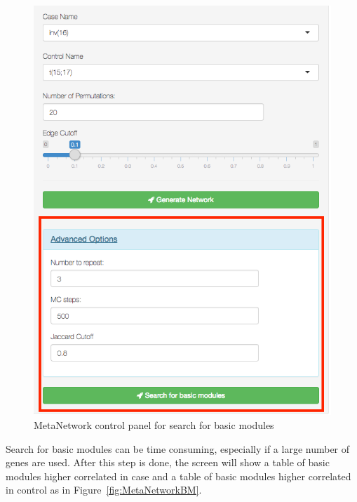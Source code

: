 \begin{steps}
\begin{figure}[H]
\begin{center}
\includegraphics[scale=0.35]{./figure/MetaNetwork/MetaNetworkstep2}
\caption{MetaNetwork control panel for search for basic modules}
\label{fig:MetaNetworkstep2}
\end{center}
\end{figure}

Search for basic modules can be time consuming, 
especially if a large number of genes are used. 
After this step is done, the screen will show a table of basic modules higher correlated in case and a table of basic modules higher correlated in control as in Figure~\ref{fig:MetaNetworkBM}. 


\end{steps}
